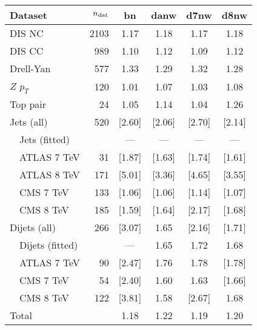 \begin{tabularx}{\textwidth}{Xrcccc}
    \toprule
     Dataset                    & $n_{\rm dat}$ &   bn   &  danw  &  d7nw  &  d8nw  \\
    \midrule
     DIS NC                     &       2103  &  1.17  &  1.18  &  1.17  &  1.18  \\
     DIS CC                     &        989  &  1.10  &  1.12  &  1.09  &  1.12  \\
     Drell-Yan                  &        577  &  1.33  &  1.29  &  1.32  &  1.28  \\
     $Z$ $p_T$                  &        120  &  1.01  &  1.07  &  1.03  &  1.08  \\
     Top pair                   &         24  &  1.05  &  1.14  &  1.04  &  1.26  \\
     Jets (all)                 &        520  & [2.60] & [2.06] & [2.70] & [2.14] \\
     \ \ Jets (fitted)          &             &  ---   &  ---   &  ---   &  ---   \\
     \ \ ATLAS 7 TeV            &         31  & [1.87] & [1.63] & [1.74] & [1.61] \\
     \ \ ATLAS 8 TeV            &        171  & [5.01] & [3.36] & [4.65] & [3.55] \\
     \ \ CMS   7 TeV            &        133  & [1.06] & [1.06] & [1.14] & [1.07] \\
     \ \ CMS   8 TeV            &        185  & [1.59] & [1.64] & [2.17] & [1.68] \\
     Dijets (all)               &        266  & [3.07] &  1.65  & [2.16] & [1.71] \\
     \ \ Dijets (fitted)        &             &  ---   &  1.65  &  1.72  &  1.68  \\
     \ \ ATLAS 7 TeV            &         90  & [2.47] &  1.76  &  1.78  & [1.78] \\
     \ \ CMS   7 TeV            &         54  & [2.40] &  1.60  &  1.63  & [1.66] \\
     \ \ CMS   8 TeV            &        122  & [3.81] &  1.58  & [2.67] &  1.68  \\
    \midrule
     Total                      &             &  1.18  &  1.22  &  1.19  &  1.20  \\
    \bottomrule
    \end{tabularx}
